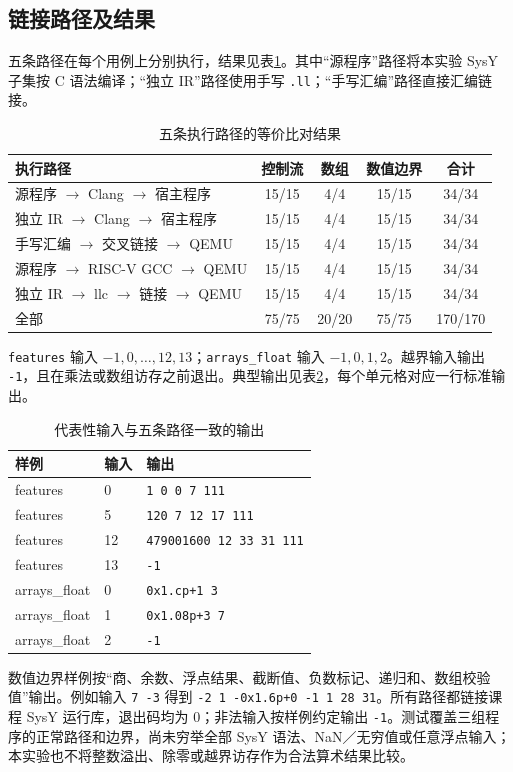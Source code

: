 \documentclass[UTF8,a4paper,10pt,fontset=fandol]{ctexart}
\begin{document}
\subsection{链接路径及结果}
五条路径在每个用例上分别执行，结果见表\ref{tab:results}。其中“源程序”路径将本实验 SysY 子集按 C 语法编译；“独立 IR”路径使用手写 \texttt{.ll}；“手写汇编”路径直接汇编链接。
\begin{table}[H]
\centering\small
\caption{五条执行路径的等价比对结果}\label{tab:results}
\begin{tabularx}{\textwidth}{Xcccc}
\toprule
执行路径 & 控制流 & 数组 & 数值边界 & 合计\\
\midrule
源程序 $\rightarrow$ Clang $\rightarrow$ 宿主程序 & 15/15 & 4/4 & 15/15 & 34/34\\
独立 IR $\rightarrow$ Clang $\rightarrow$ 宿主程序 & 15/15 & 4/4 & 15/15 & 34/34\\
手写汇编 $\rightarrow$ 交叉链接 $\rightarrow$ QEMU & 15/15 & 4/4 & 15/15 & 34/34\\
源程序 $\rightarrow$ RISC-V GCC $\rightarrow$ QEMU & 15/15 & 4/4 & 15/15 & 34/34\\
独立 IR $\rightarrow$ llc $\rightarrow$ 链接 $\rightarrow$ QEMU & 15/15 & 4/4 & 15/15 & 34/34\\
\midrule
全部 & 75/75 & 20/20 & 75/75 & 170/170\\
\bottomrule
\end{tabularx}
\end{table}
\texttt{features} 输入 $-1,0,\ldots,12,13$；\texttt{arrays\_float} 输入 $-1,0,1,2$。越界输入输出 \texttt{-1}，且在乘法或数组访存之前退出。典型输出见表\ref{tab:examples}，每个单元格对应一行标准输出。
\begin{table}[H]
\centering\small
\caption{代表性输入与五条路径一致的输出}\label{tab:examples}
\begin{tabular}{lll}
\toprule
样例 & 输入 & 输出\\
\midrule
features & 0 & \texttt{1 0 0 7 111}\\
features & 5 & \texttt{120 7 12 17 111}\\
features & 12 & \texttt{479001600 12 33 31 111}\\
features & 13 & \texttt{-1}\\
arrays\_float & 0 & \texttt{0x1.cp+1 3}\\
arrays\_float & 1 & \texttt{0x1.08p+3 7}\\
arrays\_float & 2 & \texttt{-1}\\
\bottomrule
\end{tabular}
\end{table}
数值边界样例按“商、余数、浮点结果、截断值、负数标记、递归和、数组校验值”输出。例如输入 \texttt{7 -3} 得到 \texttt{-2 1 -0x1.6p+0 -1 1 28 31}。所有路径都链接课程 SysY 运行库，退出码均为 0；非法输入按样例约定输出 \texttt{-1}。测试覆盖三组程序的正常路径和边界，尚未穷举全部 SysY 语法、NaN／无穷值或任意浮点输入；本实验也不将整数溢出、除零或越界访存作为合法算术结果比较。
\end{document}
